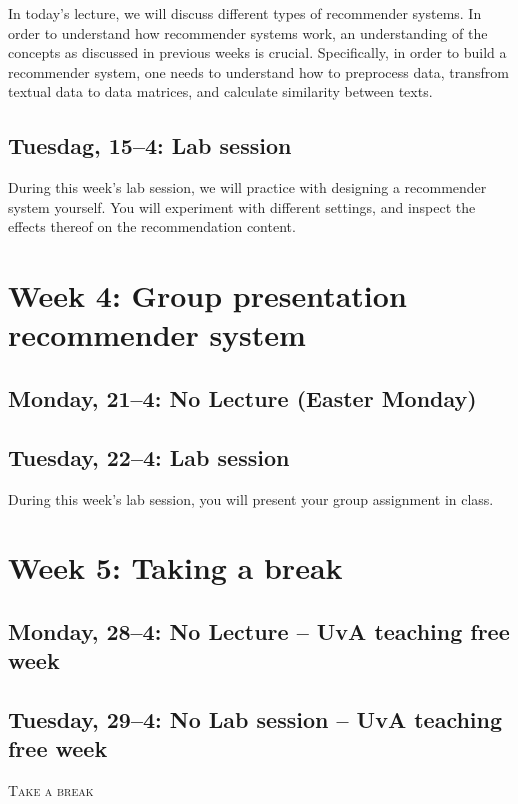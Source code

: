 In today's lecture, we will discuss different types of recommender systems. In order to understand how recommender systems work, an understanding of the concepts as discussed in previous weeks is crucial. Specifically, in order to build a recommender system, one needs to understand how to preprocess data, transfrom textual data to data matrices, and calculate similarity between texts. 

\subsection*{Tuesdag, 15--4: Lab session}
During this week's lab session, we will practice with designing a recommender system yourself. You will experiment with different settings, and inspect the effects thereof on the recommendation content. 

\section*{Week 4: Group presentation recommender system}

\subsection*{Monday, 21--4: No Lecture (Easter Monday)}

\subsection*{Tuesday, 22--4: Lab session}

During this week's lab session, you will present your group assignment in class. 

\section*{Week 5: Taking a break}

\subsection*{Monday, 28--4: No Lecture -- UvA teaching free week}
\subsection*{Tuesday, 29--4: No Lab session -- UvA teaching free week}

\textsc{ Take a break}\\

